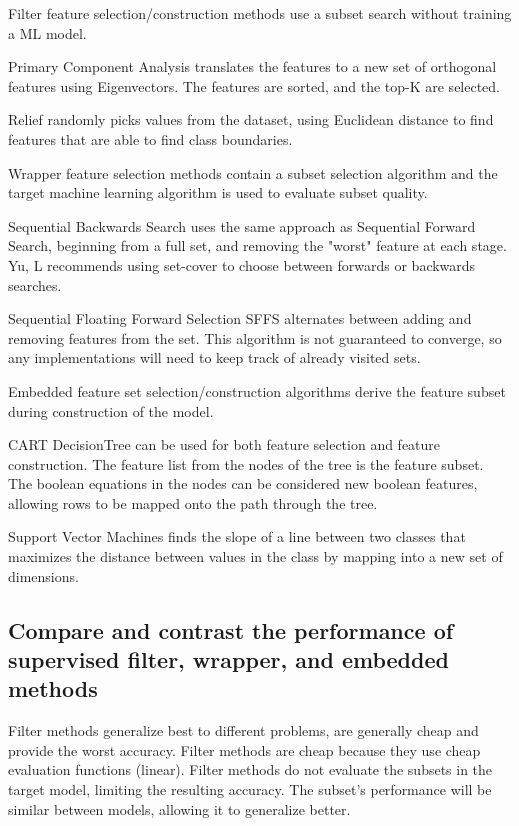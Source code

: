 \documentclass[11pt]{article}
\begin{document}
Filter feature selection/construction methods use a subset search without training a ML model.

Primary Component Analysis \cite{FRS1901LIIIOL} translates the features to a new set of orthogonal features using Eigenvectors. The features are sorted, and the top-K are selected.

Relief \cite{Kira1992TheFS} randomly picks values from the dataset, using Euclidean distance to find features that are able to find class boundaries.

Wrapper feature selection methods contain a subset selection algorithm and the target machine learning algorithm is used to evaluate subset quality.

Sequential Backwards Search \cite{week2featmanip} uses the same approach as Sequential Forward Search, beginning from a full set, and removing the "worst" feature at each stage. Yu, L \cite{subsetcover} recommends using set-cover to choose between forwards or backwards searches.

Sequential Floating Forward Selection SFFS\cite{PUDIL19941119} alternates between adding and removing features from the set. This algorithm is not guaranteed to converge, so any implementations will need to keep track of already visited sets.

Embedded feature set selection/construction algorithms derive the feature subset during construction of the model.

CART DecisionTree\cite{breiman2017classification} can be used for both feature selection and feature construction. The feature list from the nodes of the tree is the feature subset. The boolean equations in the nodes can be considered new boolean features, allowing rows to be mapped onto the path through the tree.

Support Vector Machines \cite{Cortes1995SupportvectorN} finds the slope of a line between two classes that maximizes the distance between values in the class by mapping into a new set of dimensions.

\subsection{Compare and contrast the performance of supervised filter, wrapper, and embedded methods}

Filter methods generalize best to different problems, are generally cheap and provide the worst accuracy. Filter methods are cheap because they use cheap evaluation functions (linear). Filter methods do not evaluate the subsets in the target model, limiting the resulting accuracy. The subset's performance will be similar between models, allowing it to generalize better.
\end{document}
